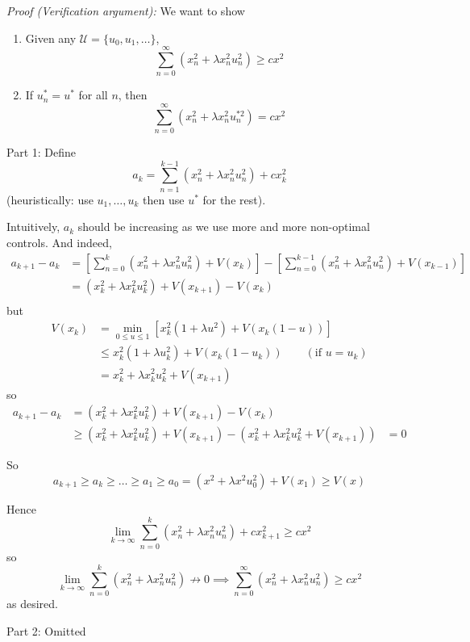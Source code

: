 \documentclass[12pt]{report}
\newenvironment*{tbox}[2][gray]{
    \begin{tcolorbox}[
        parbox=false,
        colback=#1!5!white,
        colframe=#1!75!black,
        breakable,
        title={#2}
    ]}
    {\end{tcolorbox}}
\begin{document}
        \begin{tbox}{\textbf{Theorem:} $u^* = \frac{c}{c + \lambda}$ is the optimal control and $V(x) = cx^2$ is the minimal cost if $x_0 = x$}  
            \emph{Proof (Verification argument):} We want to show 
            \begin{enumerate}
                \item Given any $\mathcal U = \{u_0, u_1, \dots\}$, 
                \[\sum_{n=0}^{\infty} (x_n^2 + \lambda x_n^2 u_n^2) \geq cx^2\]
                \item If $u_n^* = u^*$ for all $n$, then 
                \[\sum_{n=0}^\infty (x_n^2 + \lambda x_n^2 u_n^{*2}) = cx^2\]
            \end{enumerate} 

            Part 1: Define 
            \[a_k = \sum_{n=1}^{k-1} (x_n^2 + \lambda x_n^2 u_n^2) + cx_k^2\] 
            (heuristically: use $u_1, \dots, u_k$ then use $u^*$ for the rest). 

            Intuitively, $a_k$ should be increasing as we use more and more non-optimal controls. And indeed,
            \begin{align*}
                a_{k+1} - a_k &= \left[\sum_{n=0}^{k} (x_n^2 + \lambda x_n^2 u_n^2) + V(x_{k})\right] - \left[\sum_{n=0}^{k-1} (x_n^2 + \lambda x_n^2 u_n^2) + V(x_{k-1})\right]\\ 
                    &= (x_{k}^2 + \lambda x_{k}^2 u_{k}^2) + V(x_{k+1}) - V(x_{k})\\
            \end{align*}
            but 
            \begin{align*}
                V(x_{k}) &= \min_{0 \leq u \leq 1} \left[x_{k}^2(1 + \lambda u^2) + V(x_{k}(1 - u))\right]\\ 
                    &\leq x_{k}^2(1 + \lambda u_k^2) + V(x_{k}(1 - u_{k})) \qquad (\text{if } u = u_{k})\\
                    &= x_{k}^2 + \lambda x_{k}^2 u_{k}^2 + V(x_{k+1})
            \end{align*}
            so 
            \begin{align*}
                a_{k+1} - a_k &= (x_{k}^2 + \lambda x_{k}^2 u_{k}^2) + V(x_{k+1}) - V(x_{k})\\\ 
                    &\geq (x_{k}^2 + \lambda x_{k}^2 u_{k}^2) + V(x_{k+1}) - ( x_{k}^2 + \lambda x_{k}^2 u_{k}^2 + V(x_{k+1}))
                    &= 0 
            \end{align*}
        
            So 
            \[a_{k+1} \geq a_k \geq \dots \geq a_1 \geq a_0 = (x^2 + \lambda x^2 u_0^2) + V(x_1) \geq V(x)\] 

            Hence
            \[\lim_{k \to \infty} \sum_{n=0}^k (x_n^2 + \lambda x_n^2 u_n^2) + cx_{k+1}^2 \geq cx^2\]
            so 
            \[\lim_{k \to \infty} \sum_{n=0}^k (x_n^2 + \lambda x_n^2 u_n^2) \not\to 0 \implies \sum_{n=0}^{\infty} (x_n^2 + \lambda x_n^2 u_n^2) \geq cx^2\]
            as desired. 

            Part 2: Omitted
        \end{tbox}
\end{document}
